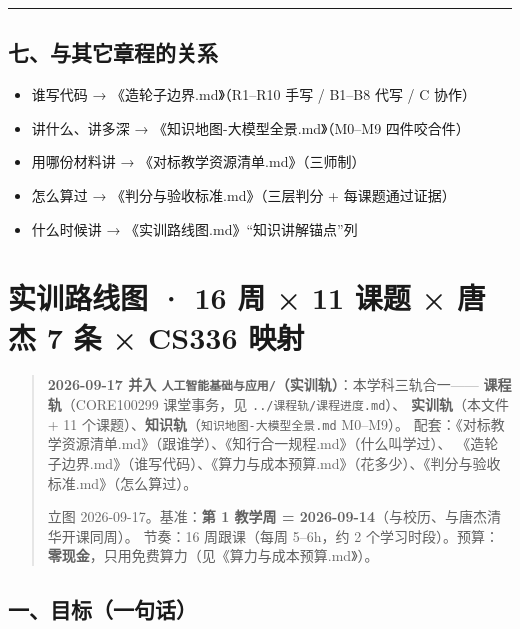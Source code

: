 \documentclass[
  chinese,
  11pt,
]{ctexart}
\providecommand{\tightlist}{%
  \setlength{\itemsep}{0pt}\setlength{\parskip}{0pt}}
\begin{document}
\begin{center}\rule{0.5\linewidth}{0.5pt}\end{center}

\subsection{七、与其它章程的关系}\label{ux4e03ux4e0eux5176ux5b83ux7ae0ux7a0bux7684ux5173ux7cfb}

\begin{itemize}
\tightlist
\item
  谁写代码 → 《造轮子边界.md》（R1--R10 手写 / B1--B8 代写 / C 协作）
\item
  讲什么、讲多深 → 《知识地图-大模型全景.md》（M0--M9 四件咬合件）
\item
  用哪份材料讲 → 《对标教学资源清单.md》（三师制）
\item
  怎么算过 → 《判分与验收标准.md》（三层判分 + 每课题通过证据）
\item
  什么时候讲 → 《实训路线图.md》``知识讲解锚点''列
\end{itemize}

\newpage

\section{实训路线图 · 16 周 × 11 课题 × 唐杰 7 条 × CS336 映射}\label{ux5b9eux8badux8defux7ebfux56fe-16-ux5468-11-ux8bfeux9898-ux5510ux6770-7-ux6761-cs336-ux6620ux5c04}

\begin{quote}
\textbf{2026-09-17 并入 \texttt{人工智能基础与应用/}（实训轨）}：本学科三轨合一------ \textbf{课程轨}（CORE100299 课堂事务，见 \texttt{../课程轨/课程进度.md}）、 \textbf{实训轨}（本文件 + 11 个课题）、\textbf{知识轨}（\texttt{知识地图-大模型全景.md} M0--M9）。 配套：《对标教学资源清单.md》（跟谁学）、《知行合一规程.md》（什么叫学过）、 《造轮子边界.md》（谁写代码）、《算力与成本预算.md》（花多少）、《判分与验收标准.md》（怎么算过）。

立图 2026-09-17。基准：\textbf{第 1 教学周 = 2026-09-14}（与校历、与唐杰清华开课同周）。 节奏：16 周跟课（每周 5--6h，约 2 个学习时段）。预算：\textbf{零现金}，只用免费算力（见《算力与成本预算.md》）。
\end{quote}

\subsection{一、目标（一句话）}\label{ux4e00ux76eeux6807ux4e00ux53e5ux8bdd}
\end{document}
